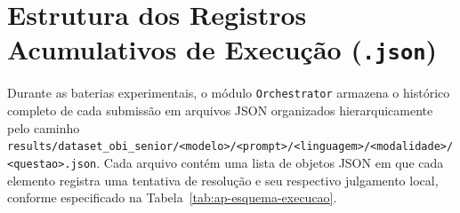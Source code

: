 \section{Estrutura dos Registros Acumulativos de Execução (\texttt{.json})}\label{ap:esquema-execucao}

Durante as baterias experimentais, o módulo \texttt{Orchestrator} armazena o histórico completo de cada submissão em arquivos JSON organizados hierarquicamente pelo caminho \texttt{results/\allowbreak dataset\_obi\_senior/\allowbreak <modelo>/\allowbreak <prompt>/\allowbreak <linguagem>/\allowbreak <modalidade>/\allowbreak <questao>.json}. Cada arquivo contém uma lista de objetos JSON em que cada elemento registra uma tentativa de resolução e seu respectivo julgamento local, conforme especificado na Tabela~\ref{tab:ap-esquema-execucao}.

